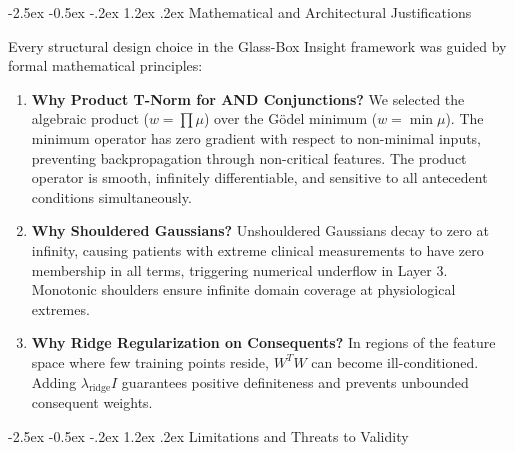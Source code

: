 \documentclass[12pt,a4paper,oneside]{report}
\makeatletter
\renewcommand\section{\@startsection {section}{1}{\z@}%
                                   {-2.5ex \@plus -0.5ex \@minus -.2ex}%
                                   {1.2ex \@plus .2ex}%
                                   {\normalfont\fontsize{13}{16}\selectfont\bfseries}}
\makeatother
\begin{document}
\section{Mathematical and Architectural Justifications}

Every structural design choice in the Glass-Box Insight framework was guided by formal mathematical principles:
\begin{enumerate}
    \setlength{\itemsep}{1pt}
    \setlength{\parskip}{0pt}
    \item \textbf{Why Product T-Norm for AND Conjunctions?} We selected the algebraic product ($w = \prod \mu$) over the Gödel minimum ($w = \min \mu$). The minimum operator has zero gradient with respect to non-minimal inputs, preventing backpropagation through non-critical features. The product operator is smooth, infinitely differentiable, and sensitive to all antecedent conditions simultaneously.
    \item \textbf{Why Shouldered Gaussians?} Unshouldered Gaussians decay to zero at infinity, causing patients with extreme clinical measurements to have zero membership in all terms, triggering numerical underflow in Layer 3. Monotonic shoulders ensure infinite domain coverage at physiological extremes.
    \item \textbf{Why Ridge Regularization on Consequents?} In regions of the feature space where few training points reside, $W^T W$ can become ill-conditioned. Adding $\lambda_{\text{ridge}} I$ guarantees positive definiteness and prevents unbounded consequent weights.
\end{enumerate}

\section{Limitations and Threats to Validity}
\end{document}
